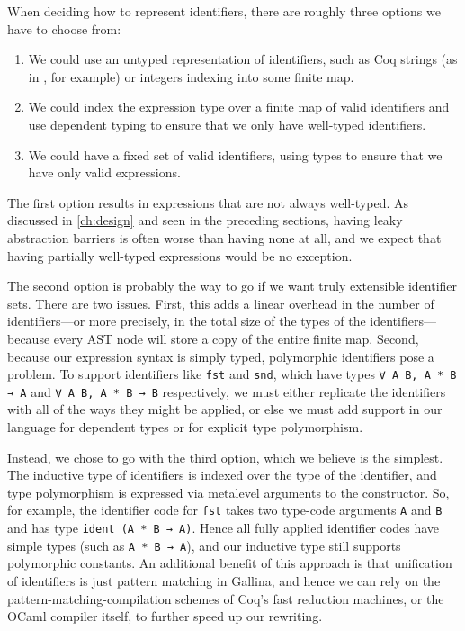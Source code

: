 When deciding how to represent identifiers, there are roughly three options we have to choose from:
\begin{enumerate}
\item
  We could use an untyped representation of identifiers, such as Coq strings (as in \textcite{TemplateCoq}, for example) or integers indexing into some finite map.
\item
  We could index the expression type over a finite map of valid identifiers and use dependent typing to ensure that we only have well-typed identifiers.
\item
  We could have a fixed set of valid identifiers, using types to ensure that we have only valid expressions.
\end{enumerate}

The first option results in expressions that are not always well-typed.
As discussed in \autoref{ch:design} and seen in the preceding sections, having leaky abstraction barriers is often worse than having none at all, and we expect that having partially well-typed expressions would be no exception.

The second option is probably the way to go if we want truly extensible identifier sets.
There are two issues.
First, this adds a linear overhead in the number of identifiers---or more precisely, in the total size of the types of the identifiers---because every AST node will store a copy of the entire finite map.
Second, because our expression syntax is simply typed, polymorphic identifiers pose a problem.
To support identifiers like \texttt{fst} and \texttt{snd}, which have types \texttt{∀ A B, A * B → A} and \texttt{∀ A B, A * B → B} respectively, we must either replicate the identifiers with all of the ways they might be applied, or else we must add support in our language for dependent types or for explicit type polymorphism.

Instead, we chose to go with the third option, which we believe is the simplest.
The inductive type of identifiers is indexed over the type of the identifier, and type polymorphism is expressed via metalevel arguments to the constructor.
So, for example, the identifier code for \texttt{fst} takes two type-code arguments \texttt{A} and \texttt{B} and has type \texttt{ident (A * B → A)}.
Hence all fully applied identifier codes have simple types (such as \texttt{A * B → A}), and our inductive type still supports polymorphic constants.
An additional benefit of this approach is that unification of identifiers is just pattern matching in Gallina, and hence we can rely on the pattern-matching-compilation schemes of Coq's fast reduction machines, or the OCaml compiler itself, to further speed up our rewriting.

